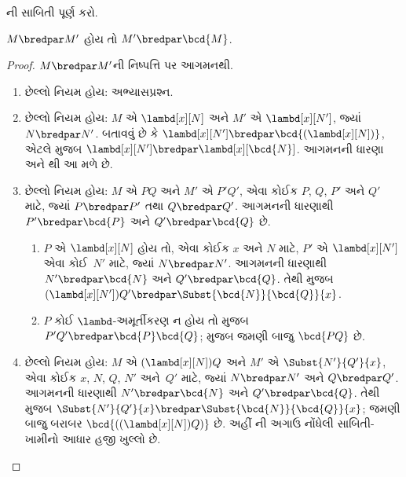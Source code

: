 \begin{prob}
  ની સાબિતી પૂર્ણ કરો.
\end{prob}

\begin{lem}
  $M \bredpar M'$ હોય તો $M' \bredpar \bcd{M}$.
\end{lem}
\begin{proof}
  $M \bredpar M'$ની નિષ્પત્તિ પર આગમનથી.
  \begin{enumerate}
    \item છેલ્લો નિયમ  હોય: અભ્યાસપ્રશ્ન.
    \item છેલ્લો નિયમ  હોય:
      $M$ એ $\lambd[x][N]$ અને $M'$ એ $\lambd[x][N']$,
      જ્યાં $N \bredpar N'$. બતાવવું છે કે
      $\lambd[x][N'] \bredpar
      \bcd{(\lambd[x][N])}$, એટલે
       મુજબ
      $\lambd[x][N'] \bredpar \lambd[x][\bcd{N}]$.
      આગમનની ધારણા અને થી આ મળે છે.
    \item છેલ્લો નિયમ  હોય:
      $M$ એ $PQ$ અને $M'$ એ $P'Q'$,
      એવા કોઈક $P$, $Q$, $P'$ અને $Q'$ માટે, જ્યાં
      $P \bredpar P'$ તથા $Q \bredpar Q'$.
      આગમનની ધારણાથી $P' \bredpar \bcd{P}$
      અને $Q' \bredpar \bcd{Q}$ છે.
      \begin{enumerate}
        \item $P$ એ $\lambd[x][N]$ હોય તો,
          એવા કોઈક $x$ અને $N$ માટે,
          $P'$ એ $\lambd[x][N']$ એવા કોઈ~$N'$ માટે,
          જ્યાં $N \bredpar N'$. આગમનની ધારણાથી
          $N' \bredpar \bcd{N}$ અને
          $Q' \bredpar \bcd{Q}$. તેથી
           મુજબ
          $(\lambd[x][N'])Q' \bredpar
          \Subst{\bcd{N}}{\bcd{Q}}{x}$.
        \item $P$ કોઈ $\lambd$-અમૂર્તીકરણ ન હોય તો
           મુજબ
          $P'Q' \bredpar \bcd{P}\bcd{Q}$;
           મુજબ જમણી બાજુ
          $\bcd{PQ}$ છે.
      \end{enumerate}
    \item છેલ્લો નિયમ  હોય:
      $M$ એ $(\lambd[x][N])Q$ અને
      $M'$ એ $\Subst{N'}{Q'}{x}$,
      એવા કોઈક $x$, $N$, $Q$, $N'$ અને~$Q'$ માટે, જ્યાં
      $N \bredpar N'$ અને $Q \bredpar Q'$.
      આગમનની ધારણાથી $N' \bredpar \bcd{N}$
      અને $Q' \bredpar \bcd{Q}$. તેથી
       મુજબ
      $\Subst{N'}{Q'}{x} \bredpar
      \Subst{\bcd{N}}{\bcd{Q}}{x}$;
      જમણી બાજુ બરાબર
      $\bcd{((\lambd[x][N])Q)}$ છે. અહીં
      ની અગાઉ નોંધેલી સાબિતી-ખામીનો
      આધાર હજી ખુલ્લો છે.
  \end{enumerate}
\end{proof}

